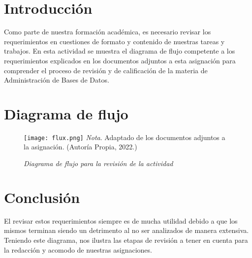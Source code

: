 \documentclass[stu, 12pt, letterpaper, donotrepeattitle, floatsintext, natbib]{apa7}
\begin{document}
\section{Introducción}
    \begin{justifying}
Como parte de nuestra formación académica, es necesario revisar los requerimientos en cuestiones de
formato y contenido de nuestras tareas y trabajos. En esta actividad se muestra el diagrama de flujo competente
a los requerimientos explicados en los documentos adjuntos a esta asignación para comprender el proceso de revisión y
de calificación de la materia de Administración de Bases de Datos.\par
    \end{justifying}

\section{Diagrama de flujo}
\begin{figure}[H]
    \caption{\emph{Diagrama de flujo para la revisión de la actividad\\}}
    \centering
    \smallskip
    \texttt{[image: flux.png]}
    \bigskip
    \justifying\small\textit{Nota}. Adaptado de los documentos adjuntos a la asignación. %
    (Autoría Propia, 2022.)
\end{figure}

\section{Conclusión}
    \begin{justifying}
El revisar estos requerimientos siempre es de mucha utilidad debido a que los mismos terminan siendo un detrimento al no ser
analizados de manera extensiva. Teniendo este diagrama, nos ilustra las etapas de revisión a tener en cuenta para
la redacción y acomodo de nuestras asignaciones.\par
    \end{justifying}

    \renewcommand\refname{\textbf{Referencias}}
\end{document}
